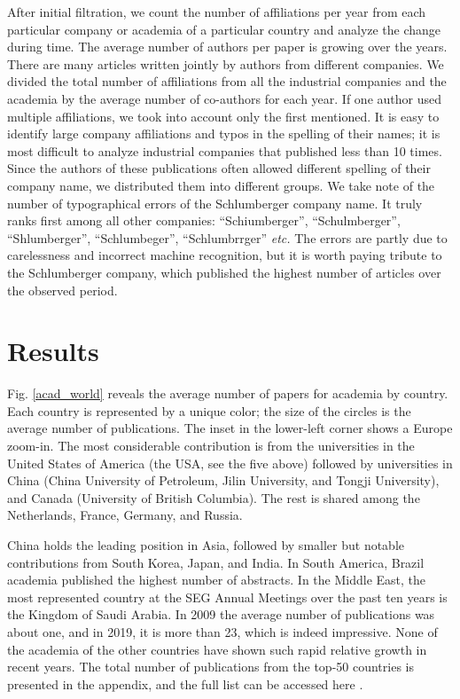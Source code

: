 \documentclass[energies,article,submit,moreauthors,pdftex]{Definitions/mdpi}
\begin{document}
After initial filtration, we count the number of affiliations per year from each particular company or academia of a particular country and analyze the change during time. The average number of authors per paper is growing over the years. There are many articles written jointly by authors from different companies. We divided the total number of affiliations from all the industrial companies and the academia by the average number of co-authors for each year. If one author used multiple affiliations, we took into account only the first mentioned. It is easy to identify large company affiliations and typos in the spelling of their names; it is most difficult to analyze industrial companies that published less than 10 times. Since the authors of these publications often allowed different spelling of their company name, we distributed them into different groups. We take note of the number of typographical errors of the  Schlumberger company name. It truly ranks first among all other companies: ``Schiumberger'', ``Schulmberger'', ``Shlumberger'', ``Schlumbeger'', ``Schlumbrrger'' \textit{etc.} The errors are partly due to carelessness and  incorrect machine recognition, but it is worth paying tribute to the Schlumberger company, which published the highest number of articles over the observed period.

 
\section{Results}

Fig. \ref{acad_world} reveals the average number of papers for academia by country. Each country is represented by a unique color; the size of the circles is the average number of publications. The inset in the lower-left corner shows a Europe zoom-in. The most considerable contribution is from the universities in the United States of America (the USA, see the five above) followed by universities in China (China University of Petroleum, Jilin University, and Tongji University), and Canada (University of British Columbia). The rest is shared among the Netherlands, France, Germany, and Russia.

China holds the leading position in Asia, followed by smaller but notable contributions from South Korea, Japan, and India. In South America, Brazil academia published the highest number of abstracts. In the Middle East, the most represented country at the SEG Annual Meetings over the past ten years is the Kingdom of Saudi Arabia. In 2009 the average number of publications was about one, and in 2019, it is more than 23, which is indeed impressive. None of the academia of the other countries have shown such rapid relative growth in recent years. The total number of publications from the top-50 countries is presented in the appendix, and the full list can be accessed here \citep{Eltsov2020}.
\end{document}
